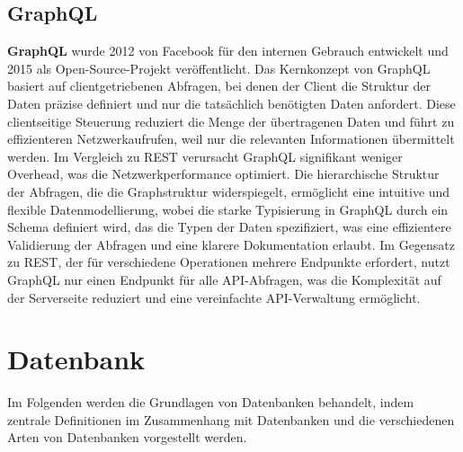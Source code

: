 \subsection{GraphQL} %
\label{sec:graphql}
\textbf{GraphQL} wurde 2012 von Facebook für den internen Gebrauch entwickelt und 2015 als Open-Source-Projekt veröffentlicht. Das Kernkonzept von GraphQL basiert auf clientgetriebenen Abfragen, bei denen der Client die Struktur der Daten präzise definiert und nur die tatsächlich benötigten Daten anfordert. Diese clientseitige Steuerung reduziert die Menge der übertragenen Daten und führt zu effizienteren Netzwerkaufrufen, weil nur die relevanten Informationen übermittelt werden. Im Vergleich zu REST verursacht GraphQL signifikant weniger Overhead, was die Netzwerkperformance optimiert. Die hierarchische Struktur der Abfragen, die die Graphstruktur widerspiegelt, ermöglicht eine intuitive und flexible Datenmodellierung, wobei die starke Typisierung in GraphQL durch ein Schema definiert wird, das die Typen der Daten spezifiziert, was eine effizientere Validierung der Abfragen und eine klarere Dokumentation erlaubt. Im Gegensatz zu REST, der für verschiedene Operationen mehrere Endpunkte erfordert, nutzt GraphQL nur einen Endpunkt für alle API-Abfragen, was die Komplexität auf der Serverseite reduziert und eine vereinfachte API-Verwaltung ermöglicht. \citep{graphqlreplacerest}

\section{Datenbank} %
\label{sec:datenbankGrundlagen}
Im Folgenden werden die Grundlagen von Datenbanken behandelt, indem zentrale Definitionen im Zusammenhang mit Datenbanken und die verschiedenen Arten von Datenbanken vorgestellt werden.
